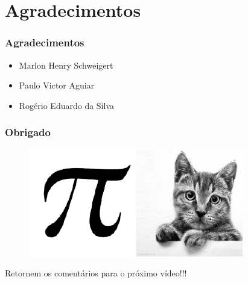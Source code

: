 \documentclass[10pt]{beamer}
\begin{document}
\section{Agradecimentos}
\begin{frame}
 \frametitle{Agradecimentos}

\begin{itemize}
  \item Marlon Henry Schweigert
  \item Paulo Victor Aguiar
  \item Rogério Eduardo da Silva
  
\end{itemize}

\end{frame}

\begin{frame}
    \frametitle{Obrigado}

\begin{figure}[!ht]
\centering
\includegraphics[height=0.45\textheight]{figures/meu_logo_picat.pdf}
\end{figure}
 Retornem os comentários para o próximo vídeo!!!


\end{frame}
\end{document}
